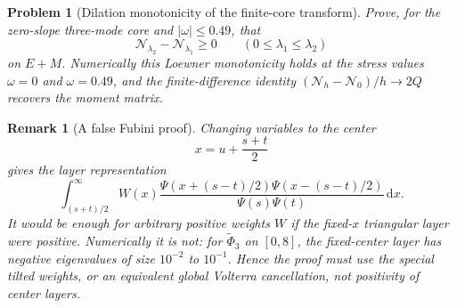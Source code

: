 \documentclass[11pt]{article}
\newtheorem{problem}[theorem]{Problem}
\newtheorem{remark}[theorem]{Remark}
\newcommand{\dd}{\,\mathrm d}
\begin{document}
\begin{problem}[Dilation monotonicity of the finite-core transform]
Prove, for the zero-slope three-mode core and $|\omega|\le0.49$, that
\[
  \mathcal N_{\lambda_2}-\mathcal N_{\lambda_1}\ge0
  \qquad(0\le\lambda_1\le\lambda_2)
\]
on $E+M$.  Numerically this Loewner monotonicity holds at the stress values
$\omega=0$ and $\omega=0.49$, and the finite-difference identity
$(\mathcal N_h-\mathcal N_0)/h\to2Q$ recovers the moment matrix.
\end{problem}

\begin{remark}[A false Fubini proof]
Changing variables to the center
\[
  x=u+\frac{s+t}{2}
\]
gives the layer representation
\[
  \int_{(s+t)/2}^\infty
  W(x)
  \frac{\Psi(x+(s-t)/2)\Psi(x-(s-t)/2)}
       {\Psi(s)\Psi(t)}
  \dd x .
\]
It would be enough for arbitrary positive weights $W$ if the fixed-$x$
triangular layer were positive.  Numerically it is not: for
$\widetilde\Phi_3$ on $[0,8]$, the fixed-center layer has negative eigenvalues
of size $10^{-2}$ to $10^{-1}$.  Hence the proof must use the special tilted
weights, or an equivalent global Volterra cancellation, not positivity of
center layers.
\end{remark}
\end{document}
